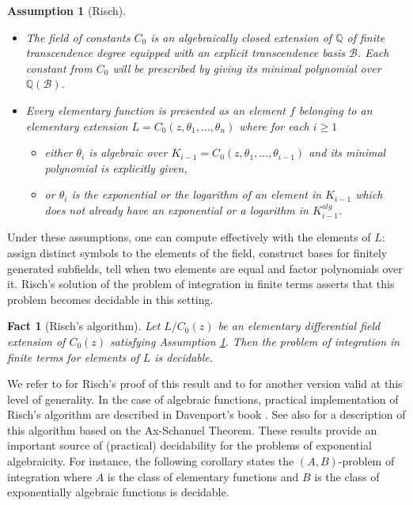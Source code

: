 \documentclass[12pt]{amsart}
\theoremstyle{definition}
\theoremstyle{plain}
\newtheorem{fact}[defn]{Fact}
\newtheorem{Assumption}[defn]{Assumption}
\theoremstyle{exampstyle}\newtheorem{thmx}{Theorem}
\theoremstyle{exampstyle}\newtheorem{thmxbis}{Theorem}
\begin{document}
\begin{Assumption}[Risch] \label{assumption-Risch} \text{ }

\begin{itemize}
\item[(1)] The field of constants $C_0$ is an algebraically closed extension of $\mathbb{Q}$ of finite transcendence degree equipped with an explicit transcendence basis $\mathcal B$. Each constant from $C_0$ will be prescribed by giving its minimal polynomial over $\mathbb{Q}(\mathcal B)$.

\item[(2)] Every elementary function is presented as an element $f$ belonging to an elementary extension $L = C_0(z,\theta_1,\ldots,\theta_n)$ where for each $i \geq 1$ 
\begin{itemize} 
\item either $\theta_i$ is algebraic over $K_{i - 1} = C_0(z,\theta_1,\ldots, \theta_{i-1})$ and its minimal polynomial is explicitly given,
\item or $\theta_i$ is the exponential or the logarithm of an element in $K_{i - 1}$  which does not already have an exponential or a logarithm in $K_{i - 1}^{alg}$.
\end{itemize} 
\end{itemize}
\end{Assumption}
Under these assumptions, one can compute effectively with the elements of $L$: assign distinct symbols to the elements of the field, construct bases for finitely generated subfields, tell when two elements are equal and factor polynomials over it.
Risch's solution of the problem of integration in finite terms asserts that this problem becomes decidable in this setting. 
 
 
 \begin{fact}[Risch's algorithm]\label{fact-Risch-algo}
Let $L/C_0(z)$ be an elementary differential field extension of $C_0(z)$ satisfying Assumption \ref{assumption-Risch}. Then the problem of integration in finite terms for elements of $L$  is decidable. 
 \end{fact}

We refer to \cite{Singer-Raab} for Risch's proof of this result and to \cite{Bronstein} for another version valid at this level of generality. In the case of algebraic functions, practical implementation of Risch's algorithm are described in Davenport's book \cite{Davenport}. See also  \cite{Pila-Tsimerman} for a description of this algorithm based on the Ax-Schanuel Theorem. These results  provide an important source of (practical) decidability for the problems of exponential algebraicity. For instance, the following corollary states the $(A,B)$-problem of integration where $A$ is the class of elementary functions and $B$ is the class of exponentially algebraic functions is decidable.
\end{document}
